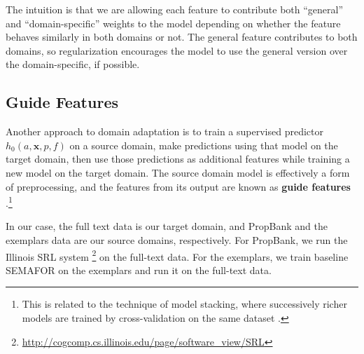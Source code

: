 \documentclass[11pt,a4paper]{article}
\newcommand{\exemplars}{\mathrm{ex}}
\newcommand{\fulltext}{\mathrm{ft}}
\newcommand{\ensuretext}[1]{#1}
\newcommand{\mkmarker}{\ensuretext{\textcolor{red}{\ensuremath{^{\textsc{M}}_{\textsc{K}}}}}}
\newcommand{\nasmarker}{\ensuretext{\textcolor{blue}{\ensuremath{^{\textsc{NA}}_{\textsc{S}}}}}}
\newcommand{\arkcomment}[3]{\ensuretext{\textcolor{#3}{[#1 #2]}}}
\newcommand{\mk}[1]{\arkcomment{\mkmarker}{#1}{red}}
\newcommand{\nascomment}[1]{\arkcomment{\nasmarker}{#1}{blue}}
\begin{document}
The intuition is that we are allowing
each feature to contribute both ``general'' and ``domain-specific'' weights to the model depending on whether the feature
behaves similarly in both domains or not.
The general feature contributes to both domains, so regularization encourages the model to use the general version over the domain-specific, if possible.

\subsection{Guide Features}
\label{sec:guide}

Another approach to domain adaptation %
is to train a supervised predictor $h_0(a,\mathbf{x},p,f)$ on a source domain, make predictions using that
model on the target domain, then use those predictions as additional features
while training a new model on the target domain.
The source domain model is effectively a form of preprocessing, and the features from its output are known as \textbf{guide features} \citep{johansson-13,kong-14}.\footnote{This is related to the technique
of model stacking, where successively richer models are trained by cross-validation on the same dataset 
\citep[e.g.,][]{cohen-05,nivre-08,martins-08}.}

In our case, the full text data is our target domain, and PropBank and the
exemplars data are our source domains, respectively.
For PropBank, we run the Illinois SRL system
 \citep{punyakanok-08}\footnote{\url{http://cogcomp.cs.illinois.edu/page/software_view/SRL}}
 on the full-text data.
For the exemplars, we train baseline SEMAFOR on the exemplars and run it on the
full-text data.
\end{document}
